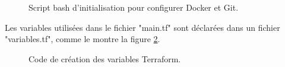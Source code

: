 \begin{itemize}
    \begin{figure}[H]
        \centering
        \caption{Script bash d'initialisation pour configurer Docker et Git.}
        \label{fig:bash}
    \end{figure}
\end{itemize}

Les variables utilisées dans le fichier "main.tf" sont déclarées dans un fichier "variables.tf", comme le montre la figure \ref{fig:var}.
    \begin{figure}[H]
        \centering
        \caption{Code de création des variables Terraform.}
        \label{fig:var}
    \end{figure}

